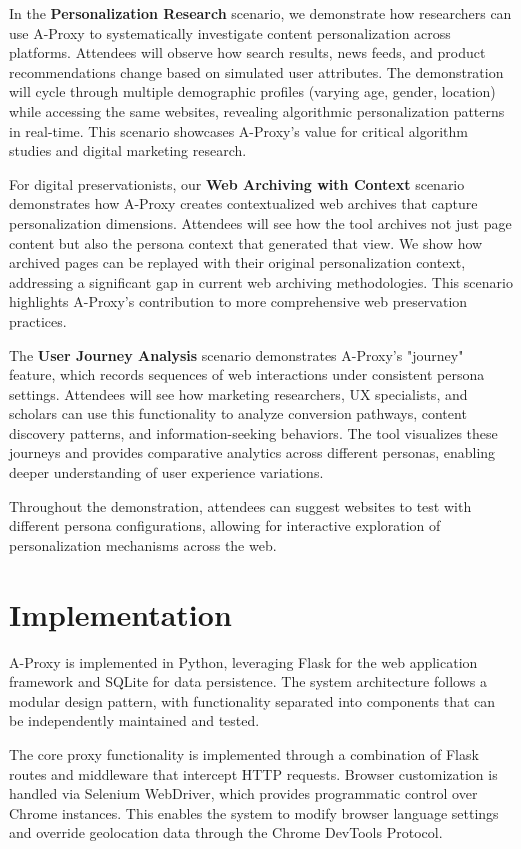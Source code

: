 \documentclass[sigconf]{acmart}
\begin{document}
In the \textbf{Personalization Research} scenario, we demonstrate how researchers can use A-Proxy to systematically investigate content personalization across platforms. Attendees will observe how search results, news feeds, and product recommendations change based on simulated user attributes. The demonstration will cycle through multiple demographic profiles (varying age, gender, location) while accessing the same websites, revealing algorithmic personalization patterns in real-time. This scenario showcases A-Proxy's value for critical algorithm studies and digital marketing research.

For digital preservationists, our \textbf{Web Archiving with Context} scenario demonstrates how A-Proxy creates contextualized web archives that capture personalization dimensions. Attendees will see how the tool archives not just page content but also the persona context that generated that view. We show how archived pages can be replayed with their original personalization context, addressing a significant gap in current web archiving methodologies. This scenario highlights A-Proxy's contribution to more comprehensive web preservation practices.

The \textbf{User Journey Analysis} scenario demonstrates A-Proxy's "journey" feature, which records sequences of web interactions under consistent persona settings. Attendees will see how marketing researchers, UX specialists, and scholars can use this functionality to analyze conversion pathways, content discovery patterns, and information-seeking behaviors. The tool visualizes these journeys and provides comparative analytics across different personas, enabling deeper understanding of user experience variations.

Throughout the demonstration, attendees can suggest websites to test with different persona configurations, allowing for interactive exploration of personalization mechanisms across the web.

\section{Implementation}
A-Proxy is implemented in Python, leveraging Flask for the web application framework and SQLite for data persistence. The system architecture follows a modular design pattern, with functionality separated into components that can be independently maintained and tested.

The core proxy functionality is implemented through a combination of Flask routes and middleware that intercept HTTP requests. Browser customization is handled via Selenium WebDriver, which provides programmatic control over Chrome instances. This enables the system to modify browser language settings and override geolocation data through the Chrome DevTools Protocol.
\end{document}
